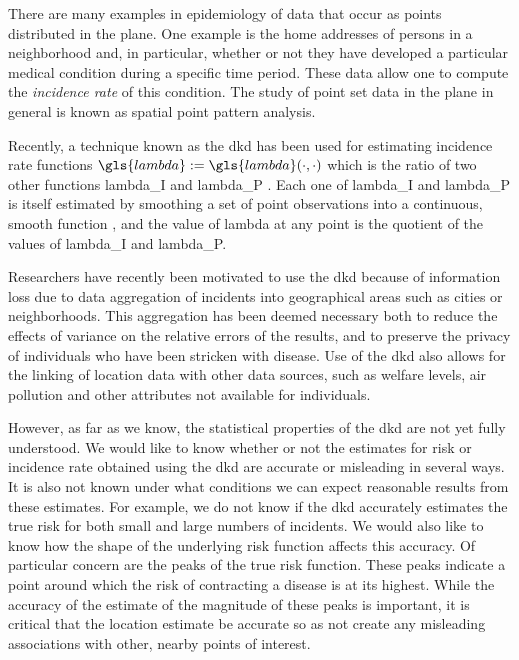 

There are many examples in epidemiology of data that occur as points distributed in the plane.
One example is
the home addresses of persons in a neighborhood and,
in particular,
whether or not they have developed a particular medical condition during a specific time period.
These data allow one to compute the \textit{\gls{incidence rate}} of this condition.
The study of point set data in the plane in general is known as spatial point pattern analysis.

Recently, a technique known as the \gls{dkd} has been used for estimating \gls{incidence rate} functions
$\gls{lambda} := \gls{lambda}\dotdot$
which is the ratio of two other functions \gls{lambda_I} and \gls{lambda_P} \citep{portnov2009studying,kloog2009using,zusman2012residential}.
Each one of \gls{lambda_I} and \gls{lambda_P} is itself estimated by smoothing a set of point observations into a continuous,
smooth function \citep{bithell1990application},
and the value of \gls{lambda} at any point is the quotient of the values of
\gls{lambda_I} and \gls{lambda_P}.

Researchers have recently been motivated to use the \gls{dkd} because of information loss
due to data aggregation of incidents into geographical areas such as cities or neighborhoods.
This aggregation has been deemed necessary both
to reduce the effects of variance on the relative errors of the results,
and to preserve the privacy of individuals who have been stricken with disease.
Use of the \gls{dkd} also allows for the linking of location data with other data sources,
such as welfare levels, air pollution and other attributes not available for individuals.

However,
as far as we know,
the statistical properties of the \gls{dkd} are not yet fully understood.
We would like to know whether or not the estimates for \gls{risk} or \gls{incidence rate}
obtained using the \gls{dkd} are accurate or misleading in several ways.
It is also not known under what conditions we can expect reasonable results from these estimates.
For example,
we do not know if the \gls{dkd} accurately estimates the true \gls{risk}
for both small and large numbers of incidents.
We would also like to know how the shape of the underlying \gls{risk} function affects this accuracy.
Of particular concern are the peaks of the true risk function.
These peaks indicate a point around which the risk of contracting a disease is at its highest.
While the accuracy of the estimate of the magnitude of these peaks is important,
it is critical that the location estimate be accurate so as not create any misleading associations
with other, nearby points of interest.

